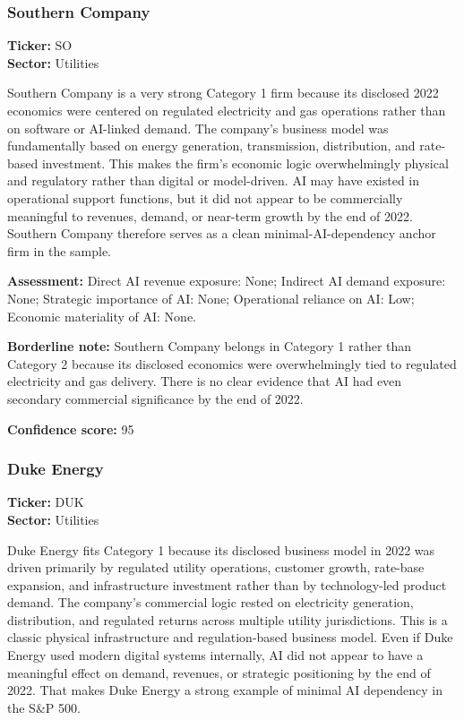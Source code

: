 \documentclass{article}
\begin{document}
\subsubsection*{Southern Company}
\textbf{Ticker:} SO \\
\textbf{Sector:} Utilities

Southern Company is a very strong Category 1 firm because its disclosed 2022 economics were centered on regulated electricity and gas operations rather than on software or AI-linked demand. The company’s business model was fundamentally based on energy generation, transmission, distribution, and rate-based investment. This makes the firm’s economic logic overwhelmingly physical and regulatory rather than digital or model-driven. AI may have existed in operational support functions, but it did not appear to be commercially meaningful to revenues, demand, or near-term growth by the end of 2022. Southern Company therefore serves as a clean minimal-AI-dependency anchor firm in the sample.

\textbf{Assessment:} Direct AI revenue exposure: None; Indirect AI demand exposure: None; Strategic importance of AI: None; Operational reliance on AI: Low; Economic materiality of AI: None.

\textbf{Borderline note:} Southern Company belongs in Category 1 rather than Category 2 because its disclosed economics were overwhelmingly tied to regulated electricity and gas delivery. There is no clear evidence that AI had even secondary commercial significance by the end of 2022.

\textbf{Confidence score:} 95

\subsubsection*{Duke Energy}
\textbf{Ticker:} DUK \\
\textbf{Sector:} Utilities

Duke Energy fits Category 1 because its disclosed business model in 2022 was driven primarily by regulated utility operations, customer growth, rate-base expansion, and infrastructure investment rather than by technology-led product demand. The company’s commercial logic rested on electricity generation, distribution, and regulated returns across multiple utility jurisdictions. This is a classic physical infrastructure and regulation-based business model. Even if Duke Energy used modern digital systems internally, AI did not appear to have a meaningful effect on demand, revenues, or strategic positioning by the end of 2022. That makes Duke Energy a strong example of minimal AI dependency in the S\&P 500.
\end{document}
